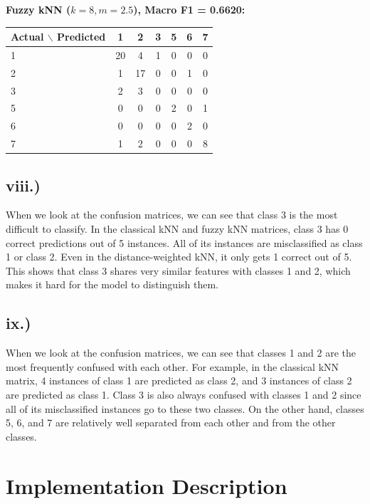 \documentclass[12pt,a4paper]{article}
\begin{document}
\textbf{Fuzzy kNN ($k=8, m=2.5$), Macro F1 = 0.6620:}

\begin{table}[h]
\centering
\begin{tabular}{l|cccccc}
\toprule
Actual $\backslash$ Predicted & 1 & 2 & 3 & 5 & 6 & 7 \\
\midrule
1 & 20 & 4 & 1 & 0 & 0 & 0 \\
2 & 1 & 17 & 0 & 0 & 1 & 0 \\
3 & 2 & 3 & 0 & 0 & 0 & 0 \\
5 & 0 & 0 & 0 & 2 & 0 & 1 \\
6 & 0 & 0 & 0 & 0 & 2 & 0 \\
7 & 1 & 2 & 0 & 0 & 0 & 8 \\
\bottomrule
\end{tabular}
\end{table}

\subsection*{viii.)}

When we look at the confusion matrices, we can see that class 3 is the most difficult to classify. In the classical kNN and fuzzy kNN matrices, class 3 has 0 correct predictions out of 5 instances. All of its instances are misclassified as class 1 or class 2. Even in the distance-weighted kNN, it only gets 1 correct out of 5. This shows that class 3 shares very similar features with classes 1 and 2, which makes it hard for the model to distinguish them.

\subsection*{ix.)}

When we look at the confusion matrices, we can see that classes 1 and 2 are the most frequently confused with each other. For example, in the classical kNN matrix, 4 instances of class 1 are predicted as class 2, and 3 instances of class 2 are predicted as class 1. Class 3 is also always confused with classes 1 and 2 since all of its misclassified instances go to these two classes. On the other hand, classes 5, 6, and 7 are relatively well separated from each other and from the other classes.

\section*{Implementation Description}
\end{document}
